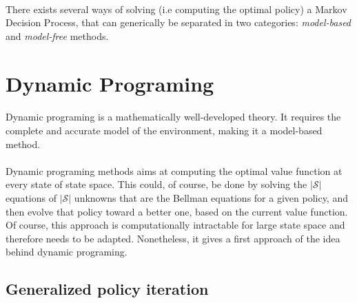 \documentclass[a4paper]{report}
\begin{document}
{			\paragraph{} There exists several ways of solving (i.e computing the optimal policy) a Markov Decision Process, that can generically be separated in two categories: \emph{model-based} and \emph{model-free} methods. 
		\section{Dynamic Programing}
		{
			\paragraph{} Dynamic programing is a mathematically well-developed theory. It requires the complete and accurate model of the environment, making it a model-based method. 
			
			\paragraph{} Dynamic programing methods aims at computing the optimal value function at every state of state space. This could, of course, be done by solving the $\vert \mathcal{S} \vert $ equations of $\vert \mathcal{S} \vert $ unknowns that are the Bellman equations for a given policy, and then evolve that policy toward a better one, based on the current value function. Of course, this approach is computationally intractable for large state space and therefore needs to be adapted. Nonetheless, it gives a first approach of the idea behind dynamic programing. 
				
			\subsection{Generalized policy iteration}
			{
}}}
\end{document}
